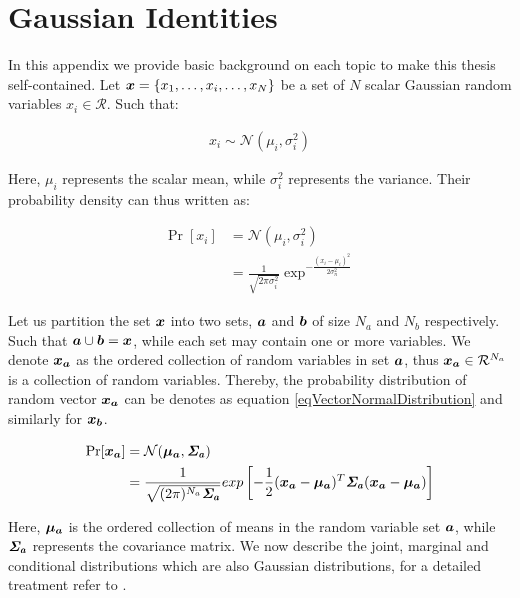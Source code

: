 \chapter{Gaussian Identities}\label{appMathematicalIdentities}

In this appendix we provide basic background on each topic to make this
thesis self-contained. Let $\boldsymbol{x} = \{x_1, \ldots, x_i, \ldots, x_N\}$ be a set of $N$ scalar Gaussian random variables $x_i \in \mathcal{R}$. Such that: 

\begin{align}
x_i \sim \mathcal{N}(\mu_i, \sigma_i^2)
\end{align}

Here, $\mu_i$ represents the scalar mean, while $\sigma_i^2$ represents the variance. Their probability density can thus written as:

\begin{align}
    \Pr[x_i] & = \mathcal{N}(\mu_i, \sigma_i^2) \\
            & = \frac{1}{\sqrt{2\pi\sigma_{i}^{2}}}\exp^{-\frac{(x_i - \mu_i)^{2}}{2\sigma_{n}^{2}}}
\end{align}


Let us partition the set $\boldsymbol{x}$ into two sets, $\boldsymbol{a}$ and $\boldsymbol{b}$ of size $N_a$ and $N_b$ respectively. Such that $\boldsymbol{a} \cup \boldsymbol{b} = \boldsymbol{x}$, while each set may contain one or more variables. We denote $\boldsymbol{x_a}$ as the ordered collection of random variables in set $\boldsymbol{a}$, thus $\boldsymbol{x_a} \in \mathcal{R}^{N_a}$ is a collection of random variables. Thereby, the probability distribution of random vector $\boldsymbol{x_a}$ can be denotes as equation \ref{eqVectorNormalDistribution} and similarly for $\boldsymbol{x_b}$.


\begin{align}\label{eqVectorNormalDistribution}
    \Pr[\boldsymbol{x_a}] & = \mathcal{N}(\boldsymbol{\mu_a}, \bm{\mathit{\Sigma_a}}) \\
            & = \frac{1}{\sqrt{(2\pi)^{N_a} \bm{\mathit{\Sigma_a}}}} exp \left [-\frac{1}{2}(\boldsymbol{x_a} - \boldsymbol{\mu_a})^{T}\bm{\mathit{\Sigma_a}}(\boldsymbol{x_a} - \boldsymbol{\mu_a}) \right ]
\end{align}

Here, $\boldsymbol{\mu_a}$ is the ordered collection of means in the random variable set $\boldsymbol{a}$, while $\bm{\mathit{\Sigma_a}}$ represents the covariance matrix. We now describe the joint, marginal and conditional distributions which are also Gaussian distributions, for a detailed treatment refer to \cite{bishop2006pattern}.

